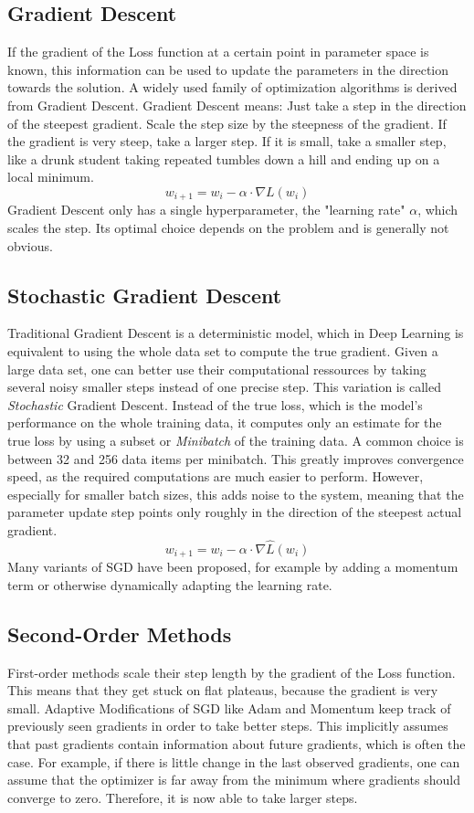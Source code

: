 \documentclass[twoside,12pt,a4paper]{report}
\begin{document}
\subsection{Gradient Descent}
If the gradient of the Loss function at a certain point in parameter space is known, this information can be used to update the parameters in the direction towards the solution. A widely used family of optimization algorithms is derived from Gradient Descent. Gradient Descent means: Just take a step in the direction of the steepest gradient. Scale the step size by the steepness of the gradient. If the gradient is very steep, take a larger step. If it is small, take a smaller step, like a drunk student taking repeated tumbles down a hill and ending up on a local minimum.
$$w_{i+1} = w_i - \alpha \cdot \nabla L(w_i) $$
Gradient Descent only has a single hyperparameter, the "learning rate" $\alpha$, which scales the step. Its optimal choice depends on the problem and is generally not obvious.

\subsection{Stochastic Gradient Descent}
Traditional Gradient Descent is a deterministic model, which in Deep Learning is equivalent to using the whole data set to compute the true gradient. Given a large data set, one can better use their computational ressources by taking several noisy smaller steps instead of one precise step.
This variation is called \textit{Stochastic} Gradient Descent. Instead of the true loss, which is the model's performance on the whole training data, it computes only an estimate for the true loss by using a subset or \textit{Minibatch} of the training data. A common choice is between 32 and 256 data items per minibatch.
This greatly improves convergence speed, as the required computations are much easier to perform. However, especially for smaller batch sizes, this adds noise to the system, meaning that the parameter update step points only roughly in the direction of the steepest actual gradient.
$$w_{i+1} = w_i - \alpha \cdot \nabla \hat{L}(w_i) $$
Many variants of SGD have been proposed, for example by adding a momentum term or otherwise dynamically adapting the learning rate.

\subsection{Second-Order Methods}
First-order methods scale their step length by the gradient of the Loss function. This means that they get stuck on flat plateaus, because the gradient is very small.
Adaptive Modifications of SGD like Adam and Momentum keep track of previously seen gradients in order to take better steps. This implicitly assumes that past gradients contain information about future gradients, which is often the case.
For example, if there is little change in the last observed gradients, one can assume that the optimizer is far away from the minimum where gradients should converge to zero. Therefore, it is now able to take larger steps.
\end{document}
